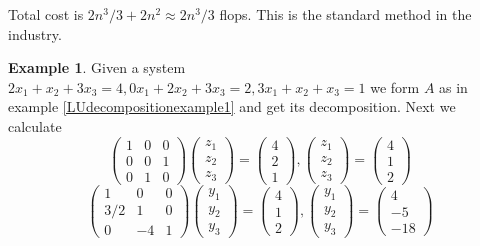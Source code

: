 \documentclass[12pt]{amsart}
\theoremstyle{definition}
\newtheorem{example}[theorem]{Example}
\begin{document}
Total cost is $2n^3/3 + 2n^2 \approx 2n^3/3$ flops. This is the standard method in the industry.

\begin{example}\label{LUdecompositionexample2} Given a system $2x_1 + x_2 + 3x_3 = 4, 0x_1 + 2x_2 + 3x_3 = 2, 3x_1 + x_2 + x_3 = 1$ we form $A$ as in example \ref{LUdecompositionexample1} and get its decomposition. Next we calculate
$$\left(\begin{array}{ccc} 1 & 0 & 0\\ 0 & 0 & 1\\ 0 & 1 & 0 \end{array}\right)\left(\begin{array}{c} z_1 \\ z_2 \\ z_3 \end{array}\right) = \left(\begin{array}{c} 4 \\ 2 \\1 \end{array}\right), \left(\begin{array}{c} z_1 \\ z_2 \\ z_3 \end{array}\right) = \left(\begin{array}{c} 4 \\ 1 \\ 2 \end{array}\right)$$
$$\left(\begin{array}{ccc} 1 & 0 & 0 \\ 3/2 & 1 & 0 \\ 0 & -4 & 1 \end{array}\right)\left(\begin{array}{c} y_1 \\ y_2 \\ y_3 \end{array}\right) = \left(\begin{array}{c} 4 \\ 1 \\ 2 \end{array}\right), \left(\begin{array}{c} y_1 \\ y_2 \\ y_3 \end{array}\right) = \left(\begin{array}{c} 4 \\ -5 \\-18 \end{array}\right)$$

\end{example}
\end{document}
